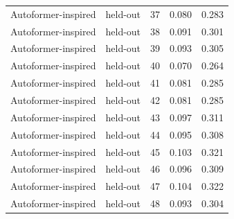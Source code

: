 \begin{tabular}{llrrr}
Autoformer-inspired & held-out & 37 & 0.080 & 0.283 \\
Autoformer-inspired & held-out & 38 & 0.091 & 0.301 \\
Autoformer-inspired & held-out & 39 & 0.093 & 0.305 \\
Autoformer-inspired & held-out & 40 & 0.070 & 0.264 \\
Autoformer-inspired & held-out & 41 & 0.081 & 0.285 \\
Autoformer-inspired & held-out & 42 & 0.081 & 0.285 \\
Autoformer-inspired & held-out & 43 & 0.097 & 0.311 \\
Autoformer-inspired & held-out & 44 & 0.095 & 0.308 \\
Autoformer-inspired & held-out & 45 & 0.103 & 0.321 \\
Autoformer-inspired & held-out & 46 & 0.096 & 0.309 \\
Autoformer-inspired & held-out & 47 & 0.104 & 0.322 \\
Autoformer-inspired & held-out & 48 & 0.093 & 0.304 \\
\bottomrule
\end{tabular}
